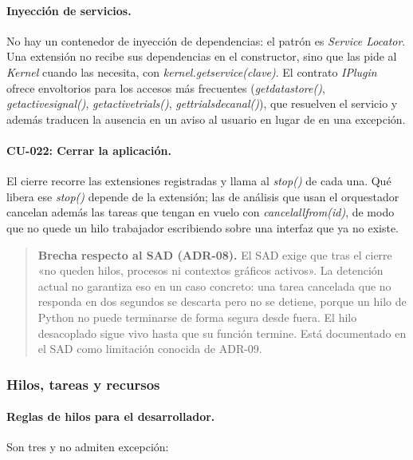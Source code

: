 \documentclass[12pt,letterpaper,oneside]{article}
\DeclareRobustCommand{\_}{\textunderscore\allowbreak}
\begin{document}
\paragraph{Inyección de servicios.} No hay un contenedor de inyección de dependencias: el patrón es \textit{Service Locator}. Una extensión no recibe sus dependencias en el constructor, sino que las pide al \textit{Kernel} cuando las necesita, con \textit{kernel.get\_service(clave)}. El contrato \textit{IPlugin} ofrece envoltorios para los accesos más frecuentes (\textit{get\_datastore()}, \textit{get\_active\_signal()}, \textit{get\_active\_trials()}, \textit{get\_trials\_de\_canal()}), que resuelven el servicio y además traducen la ausencia en un aviso al usuario en lugar de en una excepción.

\paragraph{CU-022: Cerrar la aplicación.} El cierre recorre las extensiones registradas y llama al \textit{stop()} de cada una. Qué libera ese \textit{stop()} depende de la extensión; las de análisis que usan el orquestador cancelan además las tareas que tengan en vuelo con \textit{cancel\_all\_from(id)}, de modo que no quede un hilo trabajador escribiendo sobre una interfaz que ya no existe.

\begin{quote}
\textbf{Brecha respecto al SAD (ADR-08).} El SAD exige que tras el cierre «no queden hilos, procesos ni contextos gráficos activos». La detención actual no garantiza eso en un caso concreto: una tarea cancelada que no responda en dos segundos se descarta pero no se detiene, porque un hilo de Python no puede terminarse de forma segura desde fuera. El hilo desacoplado sigue vivo hasta que su función termine. Está documentado en el SAD como limitación conocida de ADR-09.
\end{quote}

\subsubsection{Hilos, tareas y recursos}

\paragraph{Reglas de hilos para el desarrollador.} Son tres y no admiten excepción:
\end{document}
